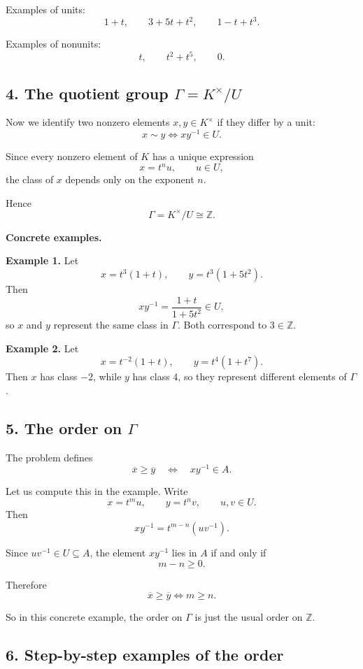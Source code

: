 \documentclass[12pt,a4paper]{article}
\theoremstyle{notespace}
\begin{document}
Examples of units:
\[
1+t,
\qquad
3+5t+t^2,
\qquad
1-t+t^3.
\]

Examples of nonunits:
\[
t,
\qquad
t^2+t^5,
\qquad
0.
\]

\subsection{4. The quotient group \(\Gamma=K^\times/U\)}

Now we identify two nonzero elements \(x,y\in K^\times\) if they differ by a unit:
\[
x\sim y
\iff
xy^{-1}\in U.
\]

Since every nonzero element of \(K\) has a unique expression
\[
x=t^n u,
\qquad u\in U,
\]
the class of \(x\) depends only on the exponent \(n\).

Hence
\[
\Gamma=K^\times/U \cong \mathbb Z.
\]

\textbf{Concrete examples.}

\textbf{Example 1.}
Let
\[
x=t^3(1+t),
\qquad
y=t^3(1+5t^2).
\]
Then
\[
xy^{-1}=\frac{1+t}{1+5t^2}\in U,
\]
so \(x\) and \(y\) represent the same class in \(\Gamma\). Both correspond to \(3\in\mathbb Z\).

\textbf{Example 2.}
Let
\[
x=t^{-2}(1+t),
\qquad
y=t^4(1+t^7).
\]
Then \(x\) has class \(-2\), while \(y\) has class \(4\), so they represent different elements of \(\Gamma\).

\subsection{5. The order on \(\Gamma\)}

The problem defines
\[
\overline x \ge \overline y
\quad \Longleftrightarrow \quad
xy^{-1}\in A.
\]

Let us compute this in the example. Write
\[
x=t^m u,
\qquad
y=t^n v,
\qquad
u,v\in U.
\]
Then
\[
xy^{-1}=t^{m-n}(uv^{-1}).
\]

Since \(uv^{-1}\in U\subseteq A\), the element \(xy^{-1}\) lies in \(A\) if and only if
\[
m-n\ge 0.
\]

Therefore
\[
\overline x \ge \overline y
\iff
m\ge n.
\]

So in this concrete example, the order on \(\Gamma\) is just the usual order on \(\mathbb Z\).

\subsection{6. Step-by-step examples of the order}
\end{document}
